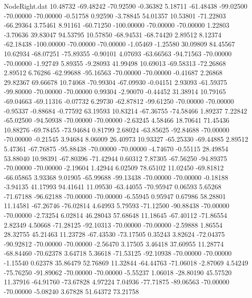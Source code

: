 \begin{filecontents}{NodeRight.dat}
  10.48732  -69.48242  -70.92590    -0.36382    5.18711  -61.48438  -99.02500  -70.00000  -70.00000   -0.51758    0.92590   -3.78845   54.01357
  10.53801  -71.22803  -66.29364     3.75461    8.91161  -60.71250 -100.00000  -70.00000  -70.00000    1.22803   -3.70636   39.83047   94.53795
  10.57850  -68.94531  -68.74420     2.89512    8.12374  -62.18438 -100.00000  -70.00000  -70.00000   -1.05469   -1.25580   30.09809   84.45567
  10.62934  -68.07251  -75.89355    -0.90101    4.07693  -63.66563  -94.71563  -70.00000  -70.00000   -1.92749    5.89355   -9.28093   41.99498
  10.69013  -69.58313  -72.26868     2.89512    6.76286  -62.99688  -95.16563  -70.00000  -70.00000   -0.41687    2.26868   29.82367   69.66678
  10.74068  -70.99304  -67.09930    -0.04151    2.93093  -61.59375  -99.80000  -70.00000  -70.00000    0.99304   -2.90070   -0.44452   31.38914
  10.79165  -69.04663  -69.11316    -0.07732    6.29730  -62.87812  -99.61250  -70.00000  -70.00000   -0.95337   -0.88684   -0.77592   63.19593
  10.83214  -67.36755  -74.58466     1.89237    7.22842  -65.02500  -94.50938  -70.00000  -70.00000   -2.63245    4.58466   18.70641   71.45436
  10.88276  -69.78455  -73.94684     0.81799    2.68024  -63.85625  -92.84688  -70.00000  -70.00000   -0.21545    3.94684    8.06009   26.40973
  10.93327  -65.25330  -69.44885     2.89512    5.47361  -67.76875  -95.88438  -70.00000  -70.00000   -4.74670   -0.55115   28.49854   53.88040
  10.98391  -67.80396  -71.42944     0.60312    7.87305  -67.56250  -94.89375  -70.00000  -70.00000   -2.19604    1.42944    6.02509   78.65102
  11.02450  -69.81812  -66.05865     3.93368    9.01905  -65.99688  -99.13438  -70.00000  -70.00000   -0.18188   -3.94135   41.17993   94.41641
  11.09530  -63.44055  -70.95947     0.06593    5.65268  -71.67188  -96.62188  -70.00000  -70.00000   -6.55945    0.95947    0.67986   58.28801
  11.14581  -67.26746  -76.02814     4.64993    5.79593  -71.12500  -90.88438  -70.00000  -70.00000   -2.73254    6.02814   46.28043   57.68648
  11.18645  -67.40112  -71.86554     2.82349    4.50668  -71.28125  -92.10313  -70.00000  -70.00000   -2.59888    1.86554   28.32755   45.21463
  11.23728  -67.43530  -73.17505     0.35243    3.82624  -72.04375  -90.92812  -70.00000  -70.00000   -2.56470    3.17505    3.46418   37.60955
  11.28774  -68.84460  -70.62378     3.64718    5.36618  -71.53125  -92.10938  -70.00000  -70.00000   -1.15540    0.62378   35.86479   52.76869
  11.32844  -64.44763  -71.06018    -2.87069    4.54249  -75.76250  -91.89062  -70.00000  -70.00000   -5.55237    1.06018  -28.80190   45.57520
  11.37916  -64.91760  -73.67828     4.97224    7.04936  -77.71875  -89.06563  -70.00000  -70.00000   -5.08240    3.67828   51.64372   73.21758

\end{filecontents}
